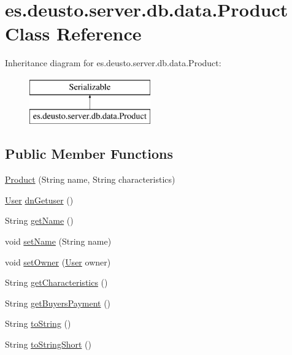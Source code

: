 \hypertarget{classes_1_1deusto_1_1server_1_1db_1_1data_1_1_product}{}\section{es.\+deusto.\+server.\+db.\+data.\+Product Class Reference}
\label{classes_1_1deusto_1_1server_1_1db_1_1data_1_1_product}
Inheritance diagram for es.\+deusto.\+server.\+db.\+data.\+Product\+:\begin{figure}[H]
\begin{center}
\leavevmode
\includegraphics[height=2.000000cm]{classes_1_1deusto_1_1server_1_1db_1_1data_1_1_product}
\end{center}
\end{figure}
\subsection*{Public Member Functions}
\begin{DoxyCompactItemize}
\item 
\hyperlink{classes_1_1deusto_1_1server_1_1db_1_1data_1_1_product_a8c697db6ce4cede760ae565dfde3ac3e}{Product} (String name, String characteristics)
\item 
\hyperlink{classes_1_1deusto_1_1server_1_1db_1_1data_1_1_user}{User} \hyperlink{classes_1_1deusto_1_1server_1_1db_1_1data_1_1_product_a2e60d68bada56d93ec2ef5e67a0c3d9f}{dn\+Getuser} ()
\item 
String \hyperlink{classes_1_1deusto_1_1server_1_1db_1_1data_1_1_product_a140ac892e13b36b2c6da61b3abb06f4e}{get\+Name} ()
\item 
void \hyperlink{classes_1_1deusto_1_1server_1_1db_1_1data_1_1_product_a68feb5bdb4b611fecd9c07eee9217ac6}{set\+Name} (String name)
\item 
void \hyperlink{classes_1_1deusto_1_1server_1_1db_1_1data_1_1_product_a72a7c230f6309248b5f6e6027189c996}{set\+Owner} (\hyperlink{classes_1_1deusto_1_1server_1_1db_1_1data_1_1_user}{User} owner)
\item 
String \hyperlink{classes_1_1deusto_1_1server_1_1db_1_1data_1_1_product_ab352b5efab8c748a45e8d28b9fad2411}{get\+Characteristics} ()
\item 
String \hyperlink{classes_1_1deusto_1_1server_1_1db_1_1data_1_1_product_a486ece3e8cc4e08b086239c0ea11b492}{get\+Buyers\+Payment} ()
\item 
String \hyperlink{classes_1_1deusto_1_1server_1_1db_1_1data_1_1_product_a4cc3da392d5679515cd8da38f88bc920}{to\+String} ()
\item 
String \hyperlink{classes_1_1deusto_1_1server_1_1db_1_1data_1_1_product_ada09de3915be881fe42f6f61bfd048f8}{to\+String\+Short} ()
\end{DoxyCompactItemize}


